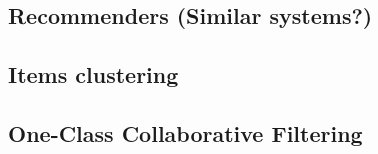 










\subsection{Recommenders (Similar systems?)}
\subsection{Items clustering}
\subsection{One-Class Collaborative Filtering}






